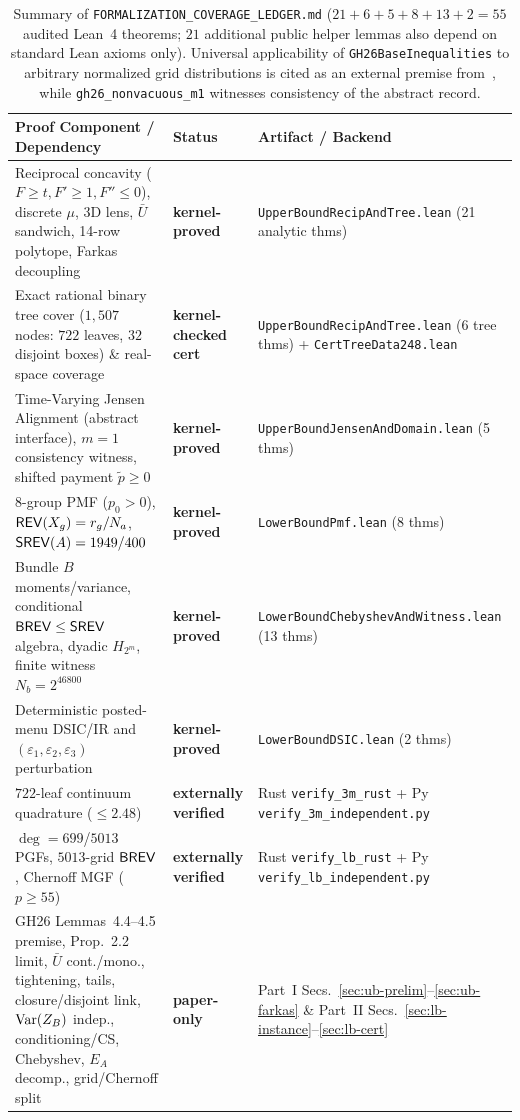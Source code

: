 \begin{table}[h]
\centering\footnotesize\setlength{\tabcolsep}{4pt}
\begin{tabular}{p{6.6cm} l p{5.5cm}}
\toprule
Proof Component / Dependency & Status & Artifact / Backend \\
\midrule
Reciprocal concavity ($F \ge t, F' \ge 1, F'' \le 0$), discrete $\mu$, 3D lens, $\bar{U}$ sandwich, 14-row polytope, Farkas decoupling & \textbf{kernel-proved} & \texttt{UpperBoundRecipAndTree.lean} (21 analytic thms) \\
Exact rational binary tree cover ($1{,}507$ nodes: $722$ leaves, $32$ disjoint boxes) \& real-space coverage & \textbf{kernel-checked cert} & \texttt{UpperBoundRecipAndTree.lean} (6 tree thms) + \texttt{CertTreeData248.lean} \\
Time-Varying Jensen Alignment (abstract interface), $m=1$ consistency witness, shifted payment $\tilde{p} \ge 0$ & \textbf{kernel-proved} & \texttt{UpperBoundJensenAndDomain.lean} (5 thms) \\
8-group PMF ($p_0 > 0$), $\mathsf{REV}(X_g) = r_g/N_a$, $\mathsf{SREV}(A) = 1949/400$ & \textbf{kernel-proved} & \texttt{LowerBoundPmf.lean} (8 thms) \\
Bundle $B$ moments/variance, conditional $\mathsf{BREV} \le \mathsf{SREV}$ algebra, dyadic $H_{2^m}$, finite witness $N_b = 2^{46800}$ & \textbf{kernel-proved} & \texttt{LowerBoundChebyshevAndWitness.lean} (13 thms) \\
Deterministic posted-menu DSIC/IR and $(\varepsilon_1,\varepsilon_2,\varepsilon_3)$ perturbation & \textbf{kernel-proved} & \texttt{LowerBoundDSIC.lean} (2 thms) \\
$722$-leaf continuum quadrature ($\le 2.48$) & \textbf{externally verified} & Rust \texttt{verify\_3m\_rust} + Py \texttt{verify\_3m\_independent.py} \\
$\deg=699$/$5013$ PGFs, $5013$-grid $\mathsf{BREV}$, Chernoff MGF ($p \ge 55$) & \textbf{externally verified} & Rust \texttt{verify\_lb\_rust} + Py \texttt{verify\_lb\_independent.py} \\
GH26 Lemmas~4.4--4.5 premise, Prop.~2.2 limit, $\bar{U}$ cont./mono., tightening, tails, closure/disjoint link, $\mathrm{Var}(Z_B)$ indep., conditioning/CS, Chebyshev, $E_A$ decomp., grid/Chernoff split & \textbf{paper-only} & Part~I Secs.~\ref{sec:ub-prelim}--\ref{sec:ub-farkas} \& Part~II Secs.~\ref{sec:lb-instance}--\ref{sec:lb-cert} \\
\bottomrule
\end{tabular}
\caption{Summary of \texttt{FORMALIZATION\_COVERAGE\_LEDGER.md} ($21 + 6 + 5 + 8 + 13 + 2 = 55$ audited Lean~4 theorems; $21$ additional public helper lemmas also depend on standard Lean axioms only). Universal applicability of \texttt{GH26BaseInequalities} to arbitrary normalized grid distributions is cited as an external premise from~\cite[Lemmas~4.4--4.5]{GiannakopoulosHahn26}, while \texttt{gh26\_nonvacuous\_m1} witnesses consistency of the abstract record.}
\label{tab:md-coverage}
\end{table}

